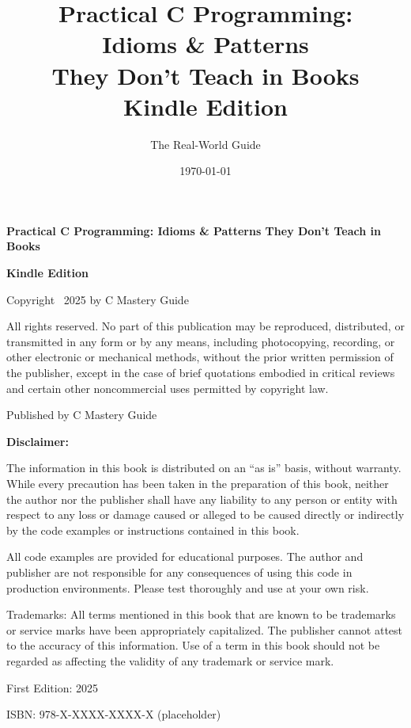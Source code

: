 \documentclass[11pt,openany]{book}
\title{\LARGE\bfseries Practical C Programming:\\Idioms \& Patterns\\They Don't Teach in Books\\[0.8em]\large Kindle Edition}
\author{\large The Real-World Guide}
\date{\today}
\begin{document}
\frontmatter
\maketitle

\thispagestyle{empty}
\vspace*{\fill}
\begin{center}
\textbf{Practical C Programming: Idioms \& Patterns They Don't Teach in Books}

\textbf{Kindle Edition}

Copyright \textcopyright\ 2025 by C Mastery Guide

All rights reserved. No part of this publication may be reproduced, distributed, or transmitted in any form or by any means, including photocopying, recording, or other electronic or mechanical methods, without the prior written permission of the publisher, except in the case of brief quotations embodied in critical reviews and certain other noncommercial uses permitted by copyright law.

\vspace{1em}

Published by C Mastery Guide

\vspace{1em}

\textbf{Disclaimer:}

The information in this book is distributed on an ``as is'' basis, without warranty. While every precaution has been taken in the preparation of this book, neither the author nor the publisher shall have any liability to any person or entity with respect to any loss or damage caused or alleged to be caused directly or indirectly by the code examples or instructions contained in this book.

All code examples are provided for educational purposes. The author and publisher are not responsible for any consequences of using this code in production environments. Please test thoroughly and use at your own risk.

\vspace{1em}

Trademarks: All terms mentioned in this book that are known to be trademarks or service marks have been appropriately capitalized. The publisher cannot attest to the accuracy of this information. Use of a term in this book should not be regarded as affecting the validity of any trademark or service mark.

\vspace{1em}

First Edition: 2025

\vspace{1em}

ISBN: 978-X-XXXX-XXXX-X (placeholder)

\end{center}
\vspace*{\fill}
\clearpage
\end{document}
